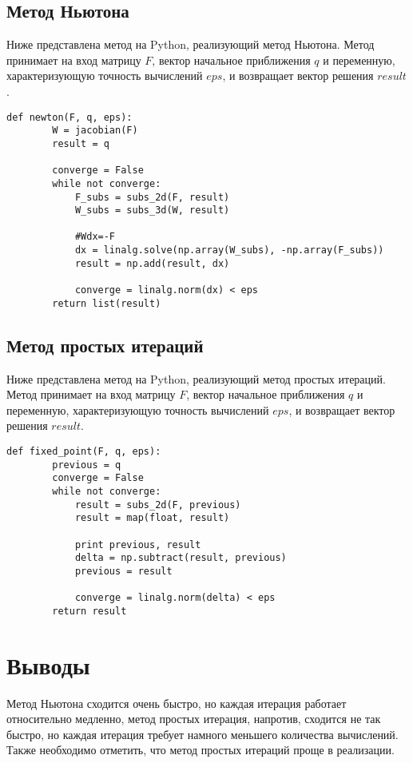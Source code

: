 \documentclass[12pt,a4paper,oneside]{extarticle}
\begin{document}
    \subsection{Метод Ньютона}
    Ниже представлена метод на Python, реализующий метод Ньютона. Метод принимает на вход матрицу $F$, вектор начальное приближения $q$ и переменную, характеризующую точность вычислений $eps$, и возвращает вектор решения $result$.
    \lstset{language=Python}
        \begin{lstlisting}[mathescape] 
    def newton(F, q, eps):        
        W = jacobian(F)
        result = q

        converge = False
        while not converge:
            F_subs = subs_2d(F, result)
            W_subs = subs_3d(W, result)

            #Wdx=-F
            dx = linalg.solve(np.array(W_subs), -np.array(F_subs))
            result = np.add(result, dx)

            converge = linalg.norm(dx) < eps
        return list(result)
    \end{lstlisting}

    \subsection{Метод простых итераций}
    Ниже представлена метод на Python, реализующий метод простых итераций. Метод принимает на вход матрицу $F$, вектор начальное приближения $q$ и переменную, характеризующую точность вычислений $eps$, и возвращает вектор решения $result$.
    \lstset{language=Python}
        \begin{lstlisting}[mathescape] 
    def fixed_point(F, q, eps):
        previous = q
        converge = False
        while not converge:
            result = subs_2d(F, previous)
            result = map(float, result)
            
            print previous, result
            delta = np.subtract(result, previous)
            previous = result

            converge = linalg.norm(delta) < eps
        return result
    \end{lstlisting}

\section{Выводы}
    Метод Ньютона сходится очень быстро, но каждая итерация работает относительно медленно, метод простых итерация, напротив, сходится не так быстро, но каждая итерация требует намного меньшего количества вычислений. Также необходимо отметить, что метод простых итераций проще в реализации.
\end{document}

